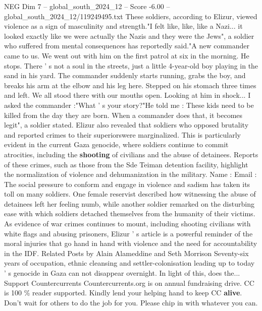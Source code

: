 \begin{textsample}{NEG Dim 7 – global\_south\_2024\_12 – Score -6.00 – global\_south\_2024\_12/119249495.txt}
These soldiers, according to Elizur, viewed violence as a sign of masculinity and strength."I felt like, like, like a Nazi... it looked exactly like we were actually the Nazis and they were the Jews", a soldier who suffered from mental consequences has reportedly said."A new commander came to us.
We went out with him on the first patrol at six in the morning.
He stops.
There ' s not a soul in the streets, just a little 4-year-old boy playing in the sand in his yard.
The commander suddenly starts running, grabs the boy, and breaks his arm at the elbow and his leg here.
Stepped on his stomach three times and left.
We all stood there with our mouths open.
Looking at him in shock...
I asked the commander :"What ' s your story?"He told me : These kids need to be killed from the day they are born.
When a commander does that, it becomes legit", a soldier stated.
Elizur also revealed that soldiers who opposed brutality and reported crimes to their superiorswere marginalized.
This is particularly evident in the current Gaza genocide, where soldiers continue to commit atrocities, including the \textbf{shooting} of civilians and the abuse of detainees.
Reports of these crimes, such as those from the Sde Teiman detention facility, highlight the normalization of violence and dehumanization in the military.
Name : Email : The social pressure to conform and engage in violence and sadism has taken its toll on many soldiers.
One female reservist described how witnessing the abuse of detainees left her feeling numb, while another soldier remarked on the disturbing ease with which soldiers detached themselves from the humanity of their victims.
As evidence of war crimes continues to mount, including shooting civilians with white flags and abusing prisoners, Elizur ' s article is a powerful reminder of the moral injuries that go hand in hand with violence and the need for accountability in the IDF.
Related Posts by Alain Alameddine and Seth Morrison Seventy-six years of occupation, ethnic cleansing and settler-colonisation leading up to today ' s genocide in Gaza can not disappear overnight.
In light of this, does the...
Support Countercurrents Countercurrents.org is on annual fundraising drive.
CC is 100 \% reader supported.
Kindly lend your helping hand to keep CC \textbf{alive}.
Don't wait for others to do the job for you.
Please chip in with whatever you can.

\end{textsample}
